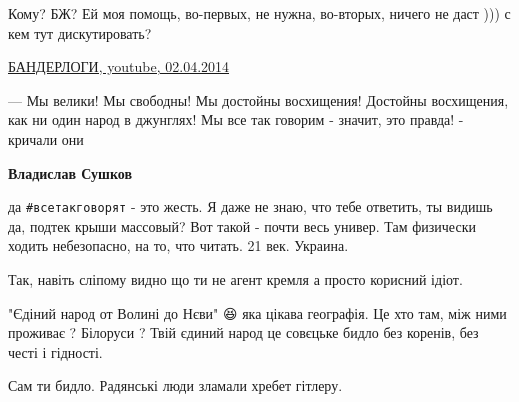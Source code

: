 \begin{itemize}
\begin{itemize}
Кому? БЖ? Ей моя помощь, во-первых, не нужна, во-вторых, ничего не даст ))) с кем тут дискутировать?

\href{https://www.youtube.com/watch?v=uPlRtohwehI}{%
БАНДЕРЛОГИ, youtube, 02.04.2014%
}

 

— Мы велики! Мы свободны! Мы достойны восхищения! Достойны восхищения, как ни
один народ в джунглях! Мы все так говорим - значит, это правда! - кричали они


 
\textbf{Владислав Сушков} 

да \verb|#всетакговорят| - это жесть. Я даже не знаю, что тебе ответить, ты
видишь да, подтек крыши массовый? Вот такой - почти весь универ. Там физически
ходить небезопасно, на то, что читать. 21 век. Украина.


\end{itemize}

 

Так, навіть сліпому видно що ти не агент кремля а просто корисний ідіот.

"Єдіний народ от Волині до Нєви" 😆 яка цікава географія. Це хто там, між ними
проживає ? Білоруси ? Твій єдиний народ це совєцьке бидло без коренів, без
честі і гідності.

\begin{itemize}
 
Сам ти бидло.
Радянські люди зламали хребет гітлеру.

 

\end{itemize}
\end{itemize}
